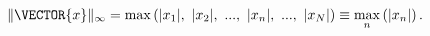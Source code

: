 \begin{example}[Norma com $p=\infty$:]
\begin{equation}
\|\VECTOR{x}\|_{\infty}=\max \left( |x_1|,~|x_2|,~...,~|x_n|,~...,~|x_N|\right)\equiv \max_n \left( |x_n|\right).
\end{equation}
\end{example}


